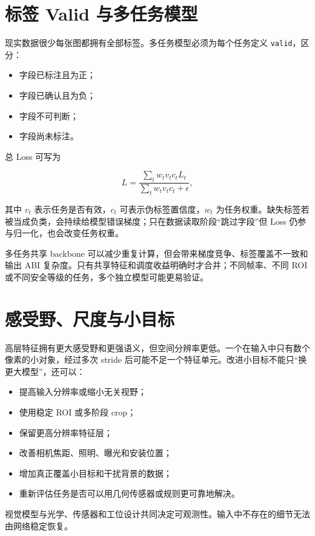 \section{标签 Valid 与多任务模型}

现实数据很少每张图都拥有全部标签。多任务模型必须为每个任务定义 \texttt{valid}，区分：

\begin{itemize}
  \item 字段已标注且为正；
  \item 字段已确认且为负；
  \item 字段不可判断；
  \item 字段尚未标注。
\end{itemize}

总 Loss 可写为

\begin{equation}
  L=\frac{\sum_t w_t v_t c_t L_t}{\sum_t w_t v_t c_t+\epsilon},
\end{equation}

其中 $v_t$ 表示任务是否有效，$c_t$ 可表示伪标签置信度，$w_t$ 为任务权重。缺失标签若被当成负类，会持续给模型错误梯度；只在数据读取阶段“跳过字段”但 Loss 仍参与归一化，也会改变任务权重。

多任务共享 backbone 可以减少重复计算，但会带来梯度竞争、标签覆盖不一致和输出 ABI 复杂度。只有共享特征和调度收益明确时才合并；不同帧率、不同 ROI 或不同安全等级的任务，多个独立模型可能更易验证。

\section{感受野、尺度与小目标}

高层特征拥有更大感受野和更强语义，但空间分辨率更低。一个在输入中只有数个像素的小对象，经过多次 stride 后可能不足一个特征单元。改进小目标不能只“换更大模型”，还可以：

\begin{itemize}
  \item 提高输入分辨率或缩小无关视野；
  \item 使用稳定 ROI 或多阶段 crop；
  \item 保留更高分辨率特征层；
  \item 改善相机焦距、照明、曝光和安装位置；
  \item 增加真正覆盖小目标和干扰背景的数据；
  \item 重新评估任务是否可以用几何传感器或规则更可靠地解决。
\end{itemize}

视觉模型与光学、传感器和工位设计共同决定可观测性。输入中不存在的细节无法由网络稳定恢复。

